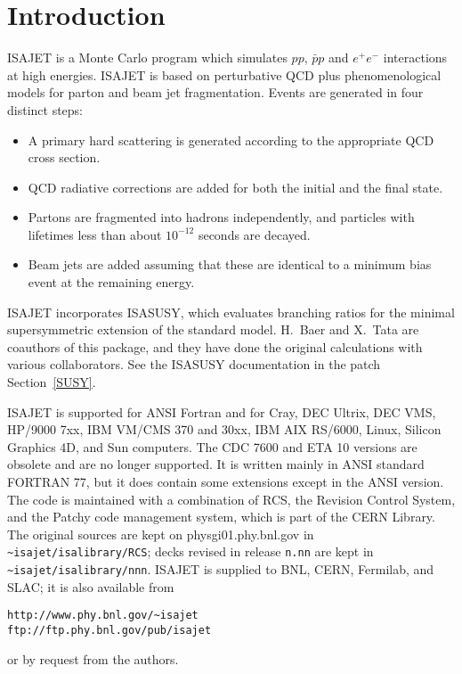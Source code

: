 \section{Introduction\label{INTRO}}

      ISAJET is a Monte Carlo program which simulates $pp$, 
$\bar pp$ and $e^+e^-$ interactions at high energies. 
ISAJET is based on
perturbative QCD plus phenomenological models for parton and beam jet
fragmentation. Events are generated in four distinct steps:
\begin{itemize}
\item A primary hard scattering is generated according to the
appropriate QCD cross section.
\item QCD radiative corrections are added for both the initial and the
final state.
\item Partons are fragmented into hadrons independently, and particles
with lifetimes less than about $10^{-12}$ seconds are decayed.
\item Beam jets are added assuming that these are identical to a
minimum bias event at the remaining energy.
\end{itemize}

      ISAJET incorporates ISASUSY, which evaluates branching ratios for
the minimal supersymmetric extension of the standard model. H.~Baer and
X.~Tata are coauthors of this package, and they have done the original
calculations with various collaborators. See the ISASUSY documentation
in the patch Section~\ref{SUSY}.

      ISAJET is supported for ANSI Fortran and for Cray, DEC Ultrix,
DEC VMS, HP/9000 7xx, IBM VM/CMS 370 and 30xx, IBM AIX RS/6000, Linux,
Silicon Graphics 4D, and Sun computers. The CDC 7600 and ETA 10
versions are obsolete and are no longer supported. It is written
mainly in ANSI standard FORTRAN 77, but it does contain some
extensions except in the ANSI version. The code is maintained with a
combination of RCS, the Revision Control System, and the Patchy code
management system, which is part of the CERN Library. The original
sources are kept on physgi01.phy.bnl.gov in
\verb|~isajet/isalibrary/RCS|; decks revised in release \verb|n.nn|
are kept in \verb|~isajet/isalibrary/nnn|. ISAJET is supplied to BNL,
CERN, Fermilab, and SLAC; it is also available from
\begin{verbatim}
http://www.phy.bnl.gov/~isajet
ftp://ftp.phy.bnl.gov/pub/isajet
\end{verbatim}
or by request from the authors.


